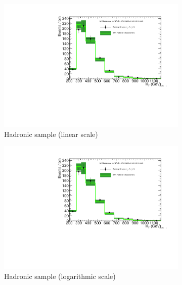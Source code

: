 \clearpage
\begin{figure}[h!]
  \centering
  \begin{subfigure}[b]{0.48\textwidth}
    \includegraphics[width=\textwidth,page=1]
    {Figs/results/v0/greenBand/bestFit_2012dev_RQcdZero_fZinvAll_1b_ge4j-12p_smOnly}
    \caption{Hadronic sample (linear scale)}
  \end{subfigure}
  \begin{subfigure}[b]{0.48\textwidth}
    \includegraphics[width=\textwidth,page=2]
    {Figs/results/v0/greenBand/bestFit_2012dev_RQcdZero_fZinvAll_1b_ge4j-12p_smOnly}
    \caption{Hadronic sample (logarithmic scale)}
  \end{subfigure}
  \begin{subfigure}[b]{0.48\textwidth}

\end{subfigure}
\end{figure}
